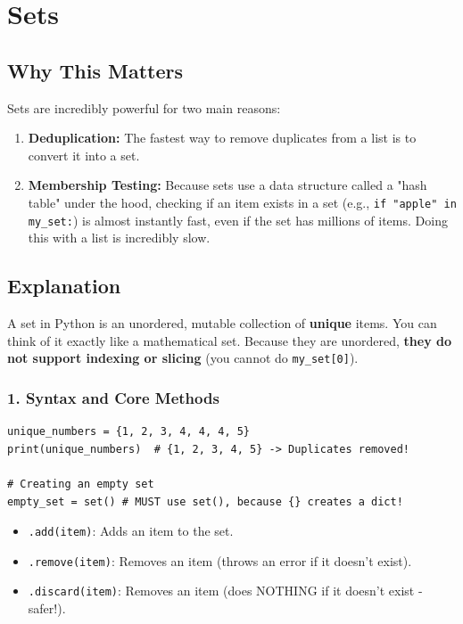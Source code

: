 \chapter{Sets}

\section{Why This Matters}
Sets are incredibly powerful for two main reasons:
\begin{enumerate}
    \item \textbf{Deduplication:} The fastest way to remove duplicates from a list is to convert it into a set.
    \item \textbf{Membership Testing:} Because sets use a data structure called a "hash table" under the hood, checking if an item exists in a set (e.g., \texttt{if "apple" in my\_set:}) is almost instantly fast, even if the set has millions of items. Doing this with a list is incredibly slow.
\end{enumerate}

\section{Explanation}
A set in Python is an unordered, mutable collection of \textbf{unique} items. You can think of it exactly like a mathematical set. Because they are unordered, \textbf{they do not support indexing or slicing} (you cannot do \texttt{my\_set[0]}).

\subsection{1. Syntax and Core Methods}
\begin{lstlisting}
unique_numbers = {1, 2, 3, 4, 4, 4, 5}
print(unique_numbers)  # {1, 2, 3, 4, 5} -> Duplicates removed!

# Creating an empty set
empty_set = set() # MUST use set(), because {} creates a dict!
\end{lstlisting}

\begin{itemize}
    \item \texttt{.add(item)}: Adds an item to the set.
    \item \texttt{.remove(item)}: Removes an item (throws an error if it doesn't exist).
    \item \texttt{.discard(item)}: Removes an item (does NOTHING if it doesn't exist - safer!).
\end{itemize}

